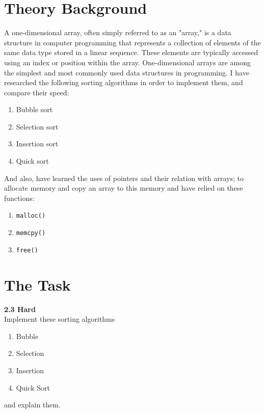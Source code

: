 \documentclass[12pt]{article}
\begin{document}
\setcounter{page}{2}
\pagestyle{fancy}
\fancyhf{}
\rhead{\thepage}

\section*{Theory Background}
A one-dimensional array, often simply referred to as an "array," is a data structure in computer programming that represents a collection of elements of the same data type stored in a linear sequence. These elements are typically accessed using an index or position within the array. One-dimensional arrays are among the simplest and most commonly used data structures in programming.
I have researched the following sorting algorithms in order to implement them, and compare their speed:
\begin{enumerate}
    \item Bubble sort
    \item Selection sort
    \item Insertion sort
    \item Quick sort
\end{enumerate}
And also, have learned the uses of pointers and their relation with arrays; to allocate\cite{malloc} memory and copy\cite{memcpy} an array to this memory and have relied on these functions:
\begin{enumerate}
    \item \texttt{malloc()}
    \item \texttt{memcpy()}
    \item \texttt{free()}
\end{enumerate}

\section*{The Task}

\textbf{2.3 Hard}\\
Implement these sorting algorithms\cite{geeks}
\begin{enumerate}
    \item Bubble
    \item Selection
    \item Insertion 
    \item Quick Sort
\end{enumerate}
and explain them.
\end{document}
